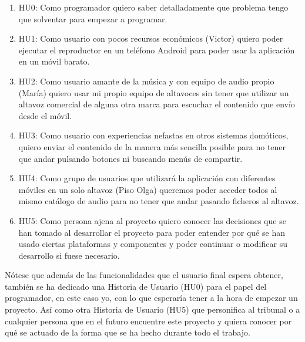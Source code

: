 \begin{enumerate}
    \item HU0: Como programador quiero saber detalladamente que problema tengo que solventar para empezar a programar.
    \item HU1: Como usuario con pocos recursos económicos (Victor) quiero poder ejecutar el reproductor en un teléfono Android para poder usar la aplicación en un móvil barato.
    \item HU2: Como usuario amante de la música y con equipo de audio propio (María) quiero usar mi propio equipo de altavoces sin tener que utilizar un altavoz comercial de alguna otra marca para escuchar el contenido que envío desde el móvil.
    \item HU3: Como usuario con experiencias nefastas en otros sistemas domóticos, quiero enviar el contenido de la manera más sencilla posible para no tener que andar pulsando botones ni buscando menús de compartir.
    \item HU4: Como grupo de usuarios que utilizará la aplicación con diferentes móviles en un solo altavoz (Piso Olga) queremos poder acceder todos al mismo catálogo de audio para no tener que andar pasando ficheros al altavoz.
    \item HU5: Como persona ajena al proyecto quiero conocer las decisiones que se han tomado al desarrollar el proyecto para poder entender por qué se han usado ciertas plataformas y componentes y poder continuar o modificar su desarrollo si fuese necesario.
\end{enumerate}

Nótese que además de las funcionalidades que el usuario final espera obtener, también se ha dedicado una Historia de Usuario (HU0) para el papel del programador, en este caso yo, con lo que esperaría tener a la hora de empezar un proyecto.
Así como otra Historia de Usuario (HU5) que personifica al tribunal o a cualquier persona que en el futuro encuentre este proyecto y quiera conocer por qué se actuado de la forma que se ha hecho durante todo el trabajo.  